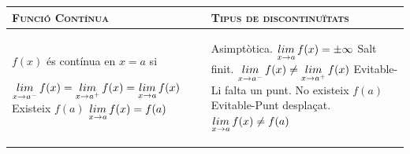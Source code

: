 \begin{center}
 
	\setlength\LTleft{0pt}
	\setlength\LTright{0pt}
	\fontsize{10.5}{11}
	\begin{longtable}[h]{|p{}|p{}|}
		\hline %
		\rowcolor{lightgray} \textbf{\textsc{Funció Contínua}} & \textbf{\textsc{Tipus de discontinuïtats}}
		\\ [0.5ex] \hline
		
		$f(x)$ és contínua en $x=a$ si
		
		\begin{enumerate}
			\exer[2] $\mathop{lim}\limits_{x\to a^-} f(x) =\mathop{lim}\limits_{x\to a^+} f(x) = \mathop{lim}\limits_{x\to a} f(x)$
			\exer[2] Existeix $f(a)$
			\exer[2] $\mathop{lim}\limits_{x\to a} f(x)=f(a)$
		\end{enumerate}
			
			&
			
			\begin{enumerate}
			\exer[2] Asimptòtica. $\mathop{lim}\limits_{x\to a} f(x)=\pm \infty$
			\exer[2] Salt finit.  $\mathop{lim}\limits_{x\to a^-} f(x) \neq \mathop{lim}\limits_{x\to a^+} f(x)$
			\exer[2] Evitable-Li falta un punt. No existeix $f(a)$
	\exer[2] Evitable-Punt desplaçat. $\mathop{lim}\limits_{x\to a} f(x)\neq f(a)$
		\end{enumerate}	
			
	 \\ [0.5ex] \hline
		
		
	\end{longtable}
\end{center}
 
